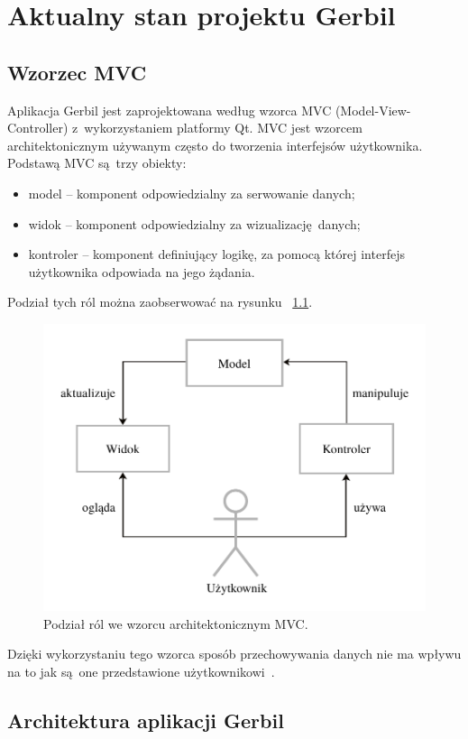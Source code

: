 \chapter{Aktualny stan projektu Gerbil}

 \section{Wzorzec MVC}

Aplikacja Gerbil jest zaprojektowana według wzorca MVC (Model-View-Controller) z~wykorzystaniem platformy Qt. MVC jest wzorcem architektonicznym używanym często do tworzenia interfejsów użytkownika. Podstawą MVC są trzy obiekty:
\begin{itemize}
	\item model -- komponent odpowiedzialny za serwowanie danych;
	\item widok -- komponent odpowiedzialny za wizualizację danych;
	\item kontroler -- komponent definiujący logikę, za pomocą której interfejs użytkownika odpowiada na jego żądania.
\end{itemize}
Podział tych ról można zaobserwować na rysunku ~\ref{fig:mvc}.

\begin{figure}[ht]
	\centering
	\includegraphics[width=0.7\linewidth]{rys04/mvc}
	\caption{Podział ról we wzorcu architektonicznym MVC.}
	\label{fig:mvc}	
\end{figure}

Dzięki wykorzystaniu tego wzorca sposób przechowywania danych nie ma wpływu na to jak są one przedstawione użytkownikowi~\cite{Qtdoc}.

\section {Architektura aplikacji Gerbil}

